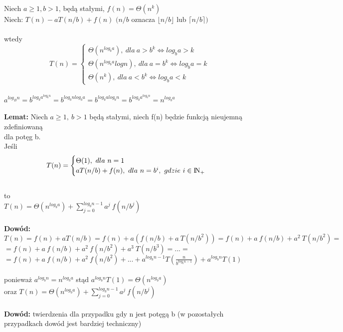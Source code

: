 Niech $a \geq 1, b > 1$, będą stałymi, $f(n) = \Theta(n^k)$\\
Niech: $T(n) - aT(n/b)+f(n)$ $(n/b$ oznacza $\lfloor n/b \rfloor $ lub $\lceil n/b \rceil)$\\
\\
wtedy 
\[
  T(n)=\begin{cases}
               \Theta(n^{log_ba}),\ dla\ a>b^k \Leftrightarrow log_ba>k\\
               \Theta(n^{log_ba}logn),\ dla\ a=b^k \Leftrightarrow log_ba=k\\
               \Theta(n^k),\ dla\ a<b^k \Leftrightarrow log_ba<k
            \end{cases}
\]\\
$a^{log_Bn}=b^{log_ba^{log_bn}}=b^{log_bnlog_ba}=b^{log_balog_bn}=b^{log_ba^{log_bn}}=n^{log_ba}$\\
\\
\textbf{Lemat: }Niech $a\geq 1,\ b>1$ będą stałymi, niech f(n) będzie funkcją nieujemną zdefiniowaną \\dla potęg b.\\
Jeśli 
\[
  T(n)=\begin{cases}
               \Theta(1),\ dla\ n=1\\
               aT(n/b) + f(n),\ dla\ n=b^i,\ gdzie\ i \in {\rm I\!N}_+
            \end{cases}
\]\\
to\\
$T(n) = \Theta(n^{log_ba}) + \sum_{j=0}^{log_bn-1} a^j\ f(n/b^j)$\\
\\
\textbf{Dowód: }
$T(n)=f(n) +a T(n/b)= f(n) + a(f(n/b)+a\ T(n/b^2)) =f(n)+a\ f(n/b) + a^2\ T(n/b^2) = $\\
$=f(n) + a\ f(n/b) + a^2\ f(n/b^2) + a^3\ T(n/b^3) = ... =$\\
$= f(n) + a\ f(n/b) + a^2\ f(n/b^2) +...+a^{log_bn-1}T(\frac{n}{b^{log_bn-1}})+ a^{log_bn}T(1)$\\
\\
ponieważ $a^{log_bn}=n^{log_ba}$ stąd $a^{log_bn}T(1) = \Theta(n^{log_ba})$\\
oraz $T(n) = \Theta(n^{log_ba})+\sum_{j=0}^{log_bn-1} a^j\ f(n/b^j)$ \\
\\
\textbf{Dowód: }twierdzenia dla przypadku gdy n jest potęgą b (w pozostałych przypadkach dowód jest bardziej techniczny)\\
